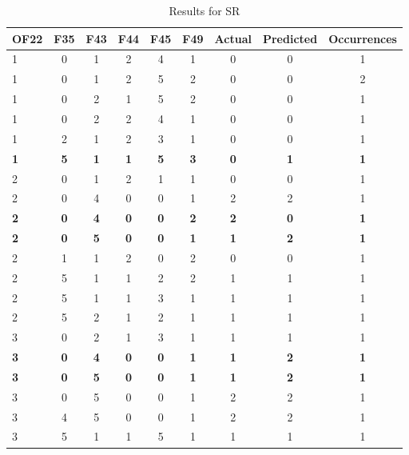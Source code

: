 \begin{table}[htbp]
\centering
\begin{tabular}{|l|c|c|c|c|c|c|c|c|}
\hline
OF22 & F35 & F43 & F44 & F45 & F49 & Actual & Predicted & Occurrences \\
\hline
1 & 0 & 1 & 2 & 4 & 1 & 0 & 0 & 1 \\
1 & 0 & 1 & 2 & 5 & 2 & 0 & 0 & 2 \\
1 & 0 & 2 & 1 & 5 & 2 & 0 & 0 & 1 \\
1 & 0 & 2 & 2 & 4 & 1 & 0 & 0 & 1 \\
1 & 2 & 1 & 2 & 3 & 1 & 0 & 0 & 1 \\
\textbf{1} & \textbf{5} & \textbf{1} & \textbf{1} & \textbf{5} & \textbf{3} & \textbf{0} & \textbf{1} & \textbf{1} \\
2 & 0 & 1 & 2 & 1 & 1 & 0 & 0 & 1 \\
2 & 0 & 4 & 0 & 0 & 1 & 2 & 2 & 1 \\
\textbf{2} & \textbf{0} & \textbf{4} & \textbf{0} & \textbf{0} & \textbf{2} & \textbf{2} & \textbf{0} & \textbf{1} \\
\textbf{2} & \textbf{0} & \textbf{5} & \textbf{0} & \textbf{0} & \textbf{1} & \textbf{1} & \textbf{2} & \textbf{1} \\
2 & 1 & 1 & 2 & 0 & 2 & 0 & 0 & 1 \\
2 & 5 & 1 & 1 & 2 & 2 & 1 & 1 & 1 \\
2 & 5 & 1 & 1 & 3 & 1 & 1 & 1 & 1 \\
2 & 5 & 2 & 1 & 2 & 1 & 1 & 1 & 1 \\
3 & 0 & 2 & 1 & 3 & 1 & 1 & 1 & 1 \\
\textbf{3} & \textbf{0} & \textbf{4} & \textbf{0} & \textbf{0} & \textbf{1} & \textbf{1} & \textbf{2} & \textbf{1} \\
\textbf{3} & \textbf{0} & \textbf{5} & \textbf{0} & \textbf{0} & \textbf{1} & \textbf{1} & \textbf{2} & \textbf{1} \\
3 & 0 & 5 & 0 & 0 & 1 & 2 & 2 & 1 \\
3 & 4 & 5 & 0 & 0 & 1 & 2 & 2 & 1 \\
3 & 5 & 1 & 1 & 5 & 1 & 1 & 1 & 1 \\
\hline
\end{tabular}
\caption{Results for SR}
\label{tab_analysis:SR_results}
\end{table}

